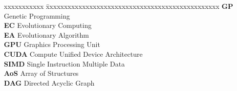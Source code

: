 \abbreviations
 
\noindent 
\begin{tabbing}
xxxxxxxxxxx \= xxxxxxxxxxxxxxxxxxxxxxxxxxxxxxxxxxxxxxxxxxxxxxxx \kill
\textbf{GP}   \> Genetic Programming \\
\textbf{EC}   \> Evolutionary Computing \\
\textbf{EA}   \> Evolutionary Algorithm \\
\textbf{GPU}  \> Graphics Processing Unit \\
\textbf{CUDA} \> Compute Unified Device Architecture \\
\textbf{SIMD} \> Single Instruction Multiple Data \\
\textbf{AoS} \> Array of Structures \\
\textbf{DAG} \> Directed Acyclic Graph
\end{tabbing}
